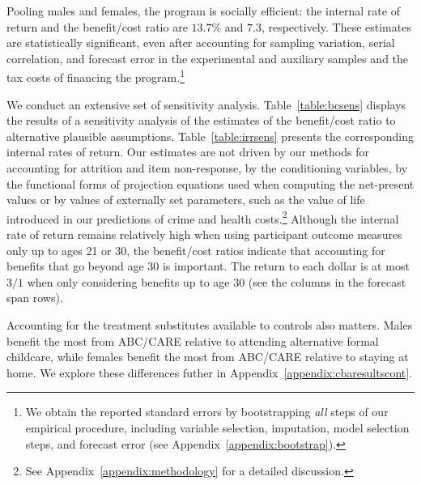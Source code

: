 Pooling males and females, the program is socially efficient: the internal rate of return and the benefit/cost ratio are $13.7\%$ and $7.3$, respectively. These estimates are statistically significant, even after accounting for sampling variation, serial correlation, and forecast error in the experimental and auxiliary samples and the tax costs of financing the program.\footnote{We obtain the reported standard errors by bootstrapping \emph{all} steps of our empirical procedure, including variable selection, imputation, model selection steps, and forecast error (see  Appendix~\ref{appendix:bootstrap}).}

We conduct an extensive set of sensitivity analysis. Table~\ref{table:bcsens} displays the results of a sensitivity analysis of the estimates of the benefit/cost ratio to alternative plausible assumptions. Table~\ref{table:irrsens} presents the corresponding internal rates of return. Our estimates are not driven by our methods for accounting for attrition and item non-response, by the conditioning variables, by the functional forms of projection equations used when computing the net-present values or by values of externally set parameters, such as the value of life introduced in our predictions of crime and health costs.\footnote{See Appendix~\ref{appendix:methodology} for a detailed discussion.} Although the internal rate of return remains relatively high when using participant outcome measures only up to ages 21 or 30, the benefit/cost ratios indicate that accounting for benefits that go beyond age 30 is important. The return to each dollar is at most $3/1$ when only considering benefits up to age 30 (see the columns in the forecast span rows).

Accounting for the treatment substitutes available to controls also matters. Males benefit the most from ABC/CARE relative to attending alternative formal childcare, while females benefit the most from ABC/CARE relative to staying at home. We explore these differences futher in Appendix~\ref{appendix:cbaresultscont}.

